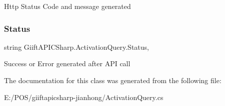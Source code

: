 Http Status Code and message generated 

\mbox{\label{class_giift_a_p_i_c_sharp_1_1_activation_query_ab811b360a3ccb4bbcaabe33aaac00bc4}} 
\subsubsection{\texorpdfstring{Status}{Status}}
{\footnotesize\ttfamily string Giift\+A\+P\+I\+C\+Sharp.\+Activation\+Query.\+Status\hspace{0.3cm}{\ttfamily [get]}, {\ttfamily [set]}}



Success or Error generated after A\+PI call 



The documentation for this class was generated from the following file\+:\begin{DoxyCompactItemize}
\item 
E\+:/\+P\+O\+S/giiftapicsharp-\/jianhong/Activation\+Query.\+cs\end{DoxyCompactItemize}

